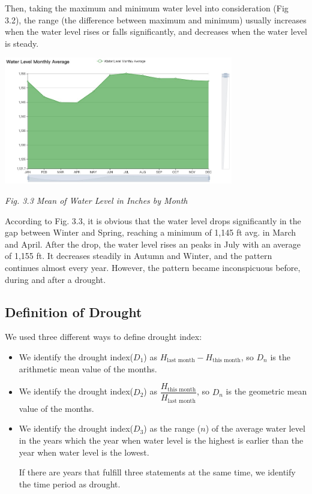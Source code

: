 \documentclass[12pt]{article}
\theoremstyle{definition}
\theoremstyle{remark}
\numberwithin{equation}{section}
\begin{document}
		Then, taking the maximum and minimum water level into consideration (Fig 3.2), the range (the difference
		between maximum and minimum) usually increases when the water level rises or falls significantly, and 
		decreases when the water level is steady.
		
		\begin{center}
		\includegraphics[width=10cm]{3.3 Mean of Water Level in Inches by Month.jpg}

		\small \textit{Fig. 3.3 Mean of Water Level in Inches by Month}
		\end{center}
		
		According to Fig. 3.3, it is obvious that the water level drops significantly in the gap between Winter and
		Spring, reaching a minimum of 1,145 ft avg. in March and April. After the drop, the water level rises an 
		peaks in July with an average of 1,155 ft. It decreases steadily in Autumn and Winter, and the pattern
		continues almost every year. However, the pattern became inconspicuous before, during and after a drought.
		
	\subsection{Definition of Drought}
		We used three different ways to define drought index:
		\begin{itemize}
			\item We identify the drought index($D_1$) as $H_\text{last month}-H_\text{this month}$, so $D_n$ is the arithmetic mean 
			value of the months.
			\item We identify the drought index($D_2$) as $\dfrac{H_\text{this month}}{H_\text{last month}}$, so $D_n$ is the  geometric
			mean value of the months.
			\item We identify the drought index($D_3$) as the range ($n$) of the average water level in the years which the year when water
			level is the highest is earlier than the year when water level is the lowest.
			
			If there are years that fulfill three statements at the same time, we identify the time period as drought.
		\end{itemize}
\end{document}
